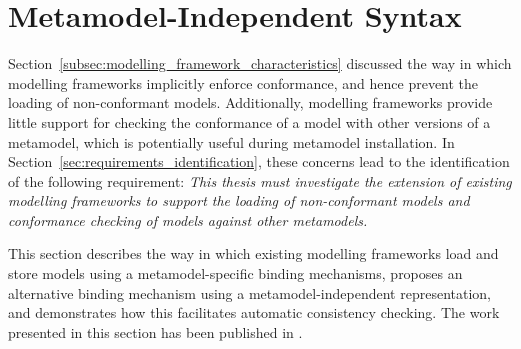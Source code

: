 
\section{Metamodel-Independent Syntax}
\label{sec:mmi_syntax}
Section~\ref{subsec:modelling_framework_characteristics} discussed the way in which modelling frameworks implicitly enforce conformance, and hence prevent the loading of non-conformant models. Additionally, modelling frameworks provide little support for checking the conformance of a model with other versions of a metamodel, which is potentially useful during metamodel installation. In Section~\ref{sec:requirements_identification}, these concerns lead to the identification of the following requirement: \emph{This thesis must investigate the extension of existing modelling frameworks to support the loading of non-conformant models and conformance checking of models against other metamodels.}

This section describes the way in which existing modelling frameworks load and store models using a metamodel-specific binding mechanisms, proposes an alternative binding mechanism using a metamodel-independent representation, and demonstrates how this facilitates automatic consistency checking. The work presented in this section has been published in \cite{rose09enhanced}.


